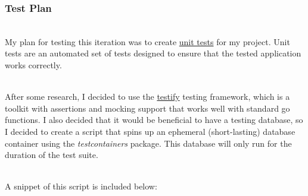 \documentclass[../../main.tex]{subfiles}
\begin{document}
\subsubsection{Test Plan}

\noindent \\ My plan for testing this iteration was to create \underline{unit tests} for my project. Unit tests are an automated set of tests designed to ensure that the tested application works correctly.

\noindent \\ After some research, I decided to use the \underline{testify} testing framework, which is a toolkit with assertions and mocking support that works well with standard go functions.
I also decided that it would be beneficial to have a testing database, so I decided to create a script that spins up an ephemeral (short-lasting) database container using the \textit{testcontainers} package. This database will only run for the duration of the test suite.

\noindent \\ A snippet of this script is included below:
\end{document}
